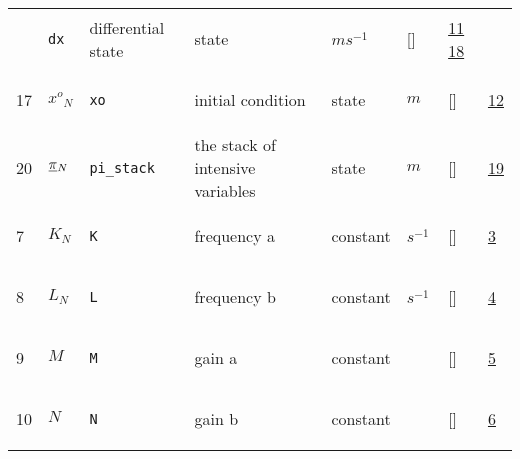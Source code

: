 \begin{longtable}{|p{1cm}|p{3cm}|p{3cm}|p{7cm}|p{3.0cm}|p{3cm}|p{2cm}|p{1cm}|}
             & \verb|dx|
             & differential state
             & \begin{lay}state \end{lay}
             & $ m s^{-1} \, $
             & []
             & \hyperlink{"e:11"}{ 11 }
                 \hyperlink{"e:18"}{ 18 }
                 \\
    17
             & \hypertarget{"v:17"}{ $ {{x^o}}{_{N}} $}
             & \verb|xo|
             & initial condition
             & \begin{lay}state \end{lay}
             & $ m  $
             & []
             & \hyperlink{"e:12"}{ 12 }
                 \\
    20
             & \hypertarget{"v:20"}{ $ {{{{\protect\underline{\bf{\pi}}}}}}{_{N}} $}
             & \verb|pi_stack|
             & the stack of intensive variables
             & \begin{lay}state \end{lay}
             & $ m  $
             & []
             & \hyperlink{"e:19"}{ 19 }
                 \\
    7
             & \hypertarget{"v:7"}{ $ {K}{_{N}} $}
             & \verb|K|
             & frequency a
             & \begin{lay}constant \end{lay}
             & $ s^{-1} \, $
             & []
             & \hyperlink{"e:3"}{ 3 }
                 \\
    8
             & \hypertarget{"v:8"}{ $ {L}{_{N}} $}
             & \verb|L|
             & frequency b
             & \begin{lay}constant \end{lay}
             & $ s^{-1} \, $
             & []
             & \hyperlink{"e:4"}{ 4 }
                 \\
    9
             & \hypertarget{"v:9"}{ $ {M}{_{}} $}
             & \verb|M|
             & gain a
             & \begin{lay}constant \end{lay}
             & $  $
             & []
             & \hyperlink{"e:5"}{ 5 }
                 \\
    10
             & \hypertarget{"v:10"}{ $ {N}{_{}} $}
             & \verb|N|
             & gain b
             & \begin{lay}constant \end{lay}
             & $  $
             & []
             & \hyperlink{"e:6"}{ 6 }
                 \\
    \end{longtable}